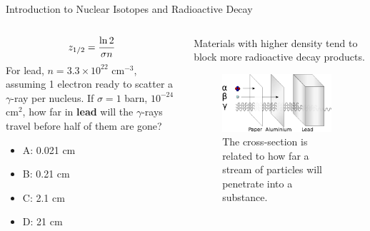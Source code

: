 \documentclass{beamer}
\begin{document}
\begin{frame}{Introduction to Nuclear Isotopes and Radioactive Decay}
\begin{columns}[T]
\begin{column}{0.6\textwidth}
\small
\begin{equation}
z_{\rm 1/2} = \frac{\ln 2}{\sigma n}
\end{equation}
For lead, $n = 3.3 \times 10^{22}$ cm$^{-3}$, assuming 1 electron ready to scatter a $\gamma$-ray per nucleus.  If $\sigma = 1$ barn, $10^{-24}$ cm$^{2}$, how far in \textbf{lead} will the $\gamma$-rays travel before half of them are gone?
\begin{itemize}
\item A: 0.021 cm
\item B: 0.21 cm
\item C: 2.1 cm
\item D: 21 cm
\end{itemize}
\end{column}
\begin{column}{0.4\textwidth}
\footnotesize
Materials with higher density tend to block more radioactive decay products.
\begin{figure}
\centering
\includegraphics[width=0.95\textwidth]{figures/radioactivity.png}
\caption{\label{fig:radio5} The cross-section is related to how far a stream of particles will penetrate into a substance.}
\end{figure}
\end{column}
\end{columns}
\end{frame}
\end{document}
